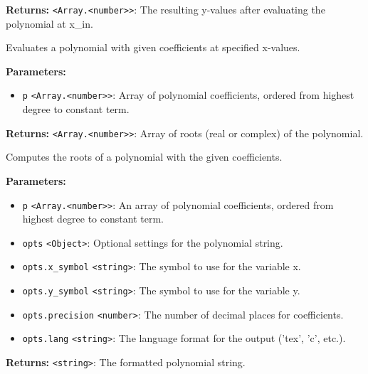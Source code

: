 \documentclass[12pt,a4paper]{article}
\begin{document}
\noindent \textbf{Returns:} \texttt{<Array.<number>>}: The resulting y-values after evaluating the polynomial at x\_in.

\noindent Evaluates a polynomial with given coefficients at specified x-values.

\vspace{5mm}
\noindent {}


\noindent \textbf{Parameters:}
\begin{itemize}
  \item \texttt{p} \texttt{<Array.<number>>}: Array of polynomial coefficients, ordered from highest degree to constant term.
\end{itemize}

\noindent \textbf{Returns:} \texttt{<Array.<number>>}: Array of roots (real or complex) of the polynomial.

\noindent Computes the roots of a polynomial with the given coefficients.

\vspace{5mm}
\noindent {}


\noindent \textbf{Parameters:}
\begin{itemize}
  \item \texttt{p} \texttt{<Array.<number>>}: An array of polynomial coefficients, ordered from highest degree to constant term.
  \item \texttt{opts} \texttt{<Object>}: Optional settings for the polynomial string.
  \item \texttt{opts.x\_symbol} \texttt{<string>}: The symbol to use for the variable x.
  \item \texttt{opts.y\_symbol} \texttt{<string>}: The symbol to use for the variable y.
  \item \texttt{opts.precision} \texttt{<number>}: The number of decimal places for coefficients.
  \item \texttt{opts.lang} \texttt{<string>}: The language format for the output ('tex', 'c', etc.).
\end{itemize}

\noindent \textbf{Returns:} \texttt{<string>}: The formatted polynomial string.
\end{document}
